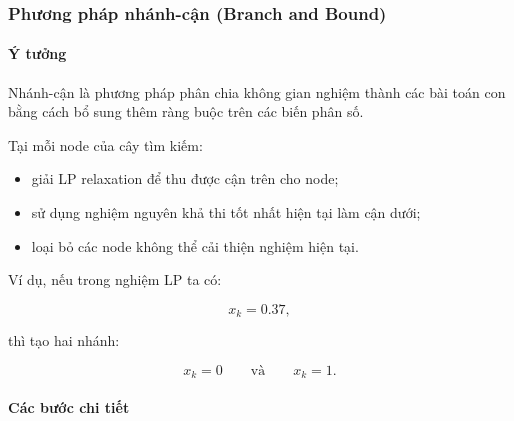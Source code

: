 \documentclass[fontsize=13pt,a4paper]{report}
\begin{document}
\subsubsection{Phương pháp nhánh-cận (Branch and Bound)}

\paragraph{Ý tưởng}

Nhánh-cận là phương pháp phân chia không gian nghiệm thành các bài toán con bằng cách bổ sung thêm ràng buộc trên các biến phân số.

Tại mỗi node của cây tìm kiếm:

\begin{itemize}
    \item giải LP relaxation để thu được cận trên cho node;
    \item sử dụng nghiệm nguyên khả thi tốt nhất hiện tại làm cận dưới;
    \item loại bỏ các node không thể cải thiện nghiệm hiện tại.
\end{itemize}

Ví dụ, nếu trong nghiệm LP ta có:

\[
x_k=0.37,
\]

thì tạo hai nhánh:

\[
x_k=0
\qquad \text{và} \qquad
x_k=1.
\]

\paragraph{Các bước chi tiết}

\hfill \\
\end{document}
